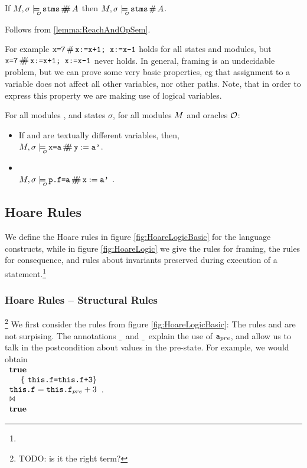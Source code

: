 \begin{lemma}
If $\M,\sigma \modelsWithO   \prg{stms} \ddisj \A$ then  $\M,\sigma \modelsWithO   \prg{stms}  \disj \A$.
\end{lemma}
\begin{Proof}Follows from \autoref{lemma:ReachAndOpSem}.\end{Proof}



For example ${\textrm{\ttfamily{x=7}}}\,\#\,{\textrm{\ttfamily{x:=x+1; x:=x-1}}}$ holds for all states and modules,  but  ${\textrm{\ttfamily{x=7}}}\,\#\!\!\!\#\,{\textrm{\ttfamily{x:=x+1; x:=x-1}}}$ never holds. In general, framing is an undecidable problem, but we can prove some very basic properties, eg that assignment to a variable does not affect all other variables, nor other paths. Note, that in order to express this property we are making use of logical variables.

\begin{lemma}
For all modules \M, and states $\sigma$, for all modules $M$ and oracles ${\cal O}$:

\begin{itemize}
\item
If  and  are textually different variables, then, \\
$\M,\sigma \modelsWithO   \prg{x=a}\ddisj \prg{y}:=\prg{a'}$.
\item
{} \\
$\M,\sigma \modelsWithO   \prg{p.f=a}\ddisj \prg{x}:=\prg{a'}$ .
\end{itemize}
\end{lemma}




\subsection{Hoare Rules}

 We define the Hoare rules in figure
\ref{fig:HoareLogicBasic} for the language constructs, while in figure \ref{fig:HoareLogic} we give the rules for framing, the rules for consequence, and rules about invariants preserved during execution of a statement.\footnote{}

\subsubsection{Hoare Rules -- Structural Rules}\footnote{TODO: is it the right term?}
We first consider the rules from figure \ref{fig:HoareLogicBasic}:
 The rules    and   are not surpising. The annotations $\_$\pre\ and $\_$\post\ explain the use of ${\textrm{\ttfamily{a}}}_{{pre}}$, and allow us to talk in the postcondition about values in the pre-state. For example, we would obtain \\
 $\begin{array}{l} {\bf {true}}\\ ~ { ~ } {\hspace{.1in}} \{\ {\textrm{\ttfamily{this.f=this.f+3}}} \} \\ {\textrm{\ttfamily{this.f}}}={\textrm{\ttfamily{this.f}}}_{{pre}}+3 \\ \Join\\ {{\bf {true}}} \end{array}  {}$.

